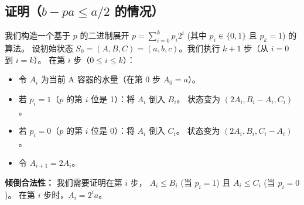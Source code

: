 \documentclass{ctexart}
\begin{document}
\subsection{证明（$b-pa \le a/2$ 的情况）}
我们构造一个基于 $p$ 的二进制展开 $p = \sum_{i=0}^k p_i 2^i$ (其中 $p_i \in \{0, 1\}$ 且 $p_k=1$) 的算法。
设初始状态 $S_0 = (A, B, C) = (a, b, c)$。我们执行 $k+1$ 步（从 $i=0$ 到 $i=k$）。
在第 $i$ 步（$0 \le i \le k$）：
\begin{itemize}
    \item 令 $A_i$ 为当前 A 容器的水量（在第 0 步 $A_0 = a$）。
    \item 若 $p_i = 1$（$p$ 的第 $i$ 位是 1）：将 $A_i$ 倒入 $B_i$。
    状态变为 $(2A_i, B_i-A_i, C_i)$。
    \item 若 $p_i = 0$（$p$ 的第 $i$ 位是 0）：将 $A_i$ 倒入 $C_i$。
    状态变为 $(2A_i, B_i, C_i-A_i)$。
    \item 令 $A_{i+1} = 2A_i$。
\end{itemize}
\textbf{倾倒合法性：}
我们需要证明在第 $i$ 步， $A_i \le B_i$ (当 $p_i=1$) 且 $A_i \le C_i$ (当 $p_i=0$)。
在第 $i$ 步时，$A_i = 2^i a$。
\end{document}
